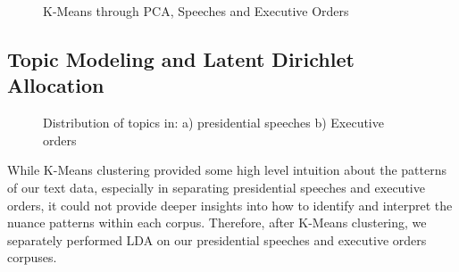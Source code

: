 \documentclass{article}
\begin{document}
{{{\begin{figure}[!htb]
	\caption{\label{fig:my-label2} K-Means through PCA, Speeches and Executive Orders}
\end{figure}

}
}

\subsection{Topic Modeling and Latent Dirichlet Allocation}{
\begin{figure}[!htb]
	\caption{\label{fig:my-label3} Distribution of topics in: a) presidential speeches b) Executive orders}
\end{figure}
While K-Means clustering provided some high level intuition about the patterns of our text data, especially in separating presidential speeches and executive orders, it could not provide deeper insights into how to identify and interpret the nuance patterns within each corpus. Therefore, after K-Means clustering, we separately performed LDA on our presidential speeches and executive orders corpuses.

}}
\end{document}
